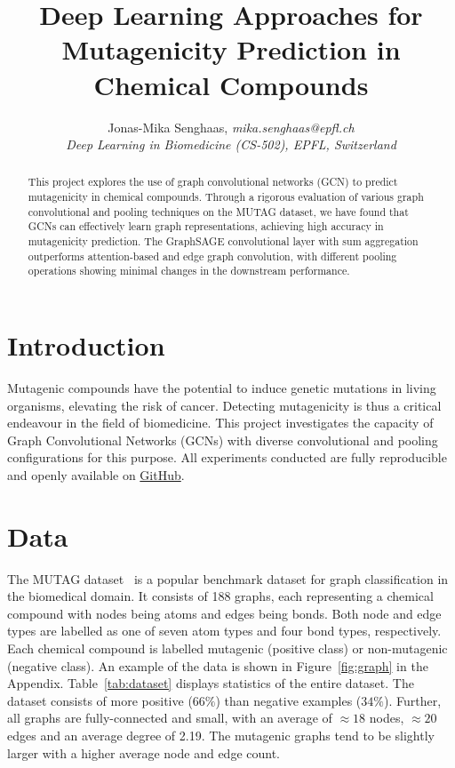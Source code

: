 \documentclass[10pt,conference,compsocconf]{IEEEtran}
\begin{document}
\title{Deep Learning Approaches for Mutagenicity Prediction in Chemical Compounds}

\author{
  Jonas-Mika Senghaas, \textit{mika.senghaas@epfl.ch} \\
  \textit{Deep Learning in Biomedicine (CS-502), EPFL, Switzerland}
}

\maketitle

\begin{abstract}

This project explores the use of graph convolutional networks (GCN) to predict
mutagenicity in chemical compounds. Through a rigorous evaluation of various
graph convolutional and pooling techniques on the MUTAG dataset, we have found
that GCNs can effectively learn graph representations, achieving high accuracy
in mutagenicity prediction. The GraphSAGE convolutional layer with sum
aggregation outperforms attention-based and edge graph convolution, with
different pooling operations showing minimal changes in the downstream
performance.

\end{abstract}


\section{Introduction}

Mutagenic compounds have the potential to induce genetic mutations in living
organisms, elevating the risk of cancer. Detecting mutagenicity is thus a
critical endeavour in the field of biomedicine. This project investigates the
capacity of Graph Convolutional Networks (GCNs) with diverse convolutional and
pooling configurations for this purpose. All experiments conducted are fully
reproducible and openly available on
\href{https://github.com/mikasenghaas/cs502}{GitHub}.

\section{Data}

The MUTAG dataset~\cite{mutag} is a popular benchmark dataset for graph
classification in the biomedical domain. It consists of 188 graphs, each
representing a chemical compound with nodes being atoms and edges being bonds.
Both node and edge types are labelled as one of seven atom types and four bond
types, respectively. Each chemical compound is labelled mutagenic (positive
class) or non-mutagenic (negative class). An example of the data is shown in
Figure~\ref{fig:graph} in the Appendix. Table~\ref{tab:dataset} displays
statistics of the entire dataset. The dataset consists of more positive ($66\%$)
than negative examples ($34\%$). Further, all graphs are fully-connected and
small, with an average of $\approx 18$ nodes, $\approx 20$ edges and an average
degree of 2.19. The mutagenic graphs tend to be slightly larger with a higher
average node and edge count. 
\end{document}
